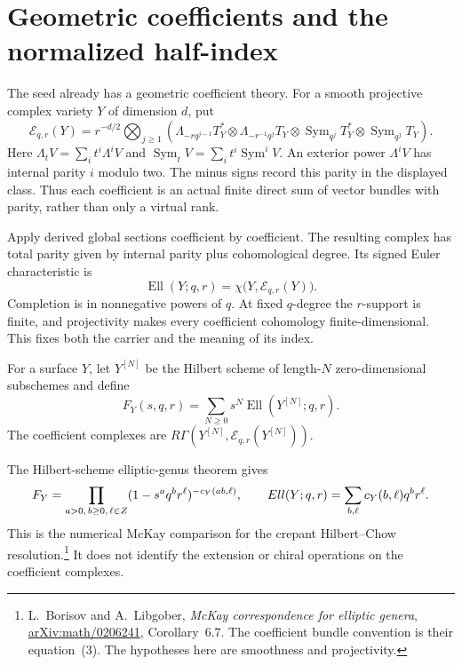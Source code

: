 \section{Geometric coefficients and the normalized half-index}
\label{op:sec:half-index}

The seed already has a geometric coefficient theory.
For a smooth projective complex variety $Y$ of dimension $d$, put
\begin{equation}\label{op:eq:elliptic-coefficient}
 \mathcal E_{q,r}(Y)=r^{-d/2}\bigotimes_{j\ge1}
 \left(
 \Lambda_{-rq^{j-1}}T_Y^*\otimes
 \Lambda_{-r^{-1}q^j}T_Y\otimes
 \operatorname{Sym}_{q^j}T_Y^*\otimes
 \operatorname{Sym}_{q^j}T_Y
 \right).
\end{equation}
Here $\Lambda_tV=\sum_i t^i\Lambda^iV$ and
$\operatorname{Sym}_tV=\sum_i t^i\operatorname{Sym}^iV$.
An exterior power $\Lambda^iV$ has internal parity $i$ modulo two.
The minus signs record this parity in the displayed class.
Thus each coefficient is an actual finite direct sum of vector
bundles with parity, rather than only a virtual rank.

Apply derived global sections coefficient by coefficient.
The resulting complex has total parity given by internal parity
plus cohomological degree. Its signed Euler characteristic is
\[
 \operatorname{Ell}(Y;q,r)
   =\chi\bigl(Y,\mathcal E_{q,r}(Y)\bigr).
\]
Completion is in nonnegative powers of $q$.
At fixed $q$-degree the $r$-support is finite, and projectivity
makes every coefficient cohomology finite-dimensional.
This fixes both the carrier and the meaning of its index.

For a surface $Y$, let $Y^{[N]}$ be the Hilbert scheme of
length-$N$ zero-dimensional subschemes and define
\[
 F_Y(s,q,r)=\sum_{N\ge0}s^N
              \operatorname{Ell}(Y^{[N]};q,r).
\]
The coefficient complexes are
$R\Gamma(Y^{[N]},\mathcal E_{q,r}(Y^{[N]}))$.

The Hilbert-scheme elliptic-genus theorem gives
\begin{equation}\label{op:eq:Hilbert-product}
 F_Y=\prod_{a>0,\,b\ge0,\,\ell\in Z}
          (1-s^aq^br^\ell)^{-c_Y(ab,\ell)},
 \qquad
 Ell(Y;q,r)=\sum_{b,\ell}c_Y(b,\ell)q^br^\ell.
\end{equation}
This is the numerical McKay comparison for the crepant
Hilbert--Chow resolution.\footnote{L.~Borisov and A.~Libgober,
\emph{McKay correspondence for elliptic genera},
\href{https://arxiv.org/abs/math/0206241}{arXiv:math/0206241},
Corollary~6.7. The coefficient bundle convention is their
equation~(3). The hypotheses here are smoothness and projectivity.}
It does not identify the extension or chiral operations on
the coefficient complexes.

